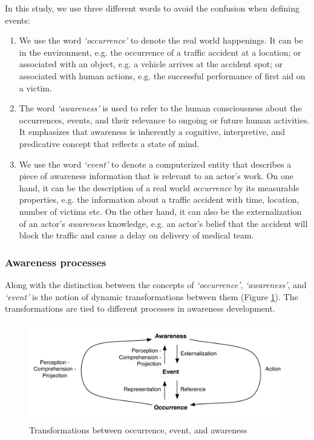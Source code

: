 In this study, we use three different words to avoid the confusion when defining events:
\begin{enumerate}
   \item We use the word \emph{`occurrence'} to denote the real world happenings. It can be in the environment, e.g. the occurrence of a traffic accident at a location; or associated with an object, e.g. a vehicle arrives at the accident spot; or associated with human actions, e.g. the successful performance of first aid on a victim. 
   \item The word \emph{`awareness'} is used to refer to the human consciousness about the occurrences, events, and their relevance to ongoing or future human activities. It emphasizes that awareness is inherently a cognitive, interpretive, and predicative concept that reflects a state of mind.
   \item We use the word \emph{`event'} to denote a computerized entity that describes a piece of awareness information that is relevant to an actor's work. On one hand, it can be the description of a real world \emph{occurrence} by its measurable properties, e.g. the information about a traffic accident with time, location, number of victims etc. On the other hand, it can also be the externalization of an actor's \emph{awareness} knowledge, e.g. an actor's belief that the accident will block the traffic and cause a delay on delivery of medical team.
\end{enumerate}

\subsubsection{Awareness processes} %
\label{ssub:awareness_processes}
Along with the distinction between the concepts of \emph{`occurrence'}, \emph{`awareness'}, and \emph{`event'} is the notion of dynamic transformations between them (Figure \ref{fig:occurrence_event_awareness}). The transformations are tied to different processes in awareness development. 

\begin{figure}[htbp] %
   \centering
   \includegraphics[width=4.5in]{occurrence_event_awareness.pdf} 
   \caption{Transformations between occurrence, event, and awareness}
   \label{fig:occurrence_event_awareness}
\end{figure}

